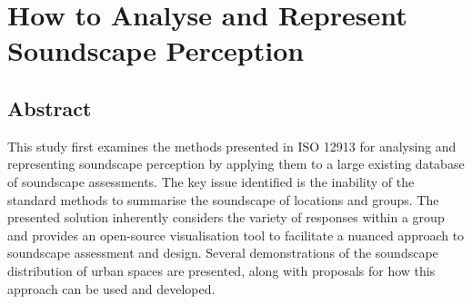 \chapter{How to Analyse and Represent Soundscape Perception}\label{ch:circumplex}

\section{Abstract}
This study first examines the methods presented in ISO 12913 for analysing and representing soundscape perception by applying them to a large existing database of soundscape assessments. The key issue identified is the inability of the standard methods to summarise the soundscape of locations and groups. The presented solution inherently considers the variety of responses within a group and provides an open-source visualisation tool to facilitate a nuanced approach to soundscape assessment and design. Several demonstrations of the soundscape distribution of urban spaces are presented, along with proposals for how this approach can be used and developed.

